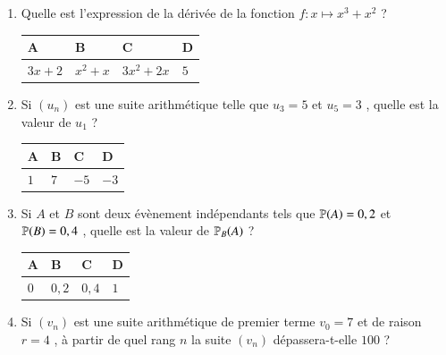 \documentclass[oneside,12pt]{exam}          %
\begin{document}
\begin{enumerate}[label=\underline{Question \no\arabic*} :  , leftmargin=* , itemsep=4mm]
	\item Quelle est l'expression de la dérivée de la fonction $f : x \mapsto x^3 + x^2$ \; ?
	
		\hspace{\linewidth-\textwidth}
		\renewcommand{\arraystretch}{1.5}
		\begin{tabular}{| P{0.22\textwidth} | P{0.22\textwidth} | P{0.22\textwidth} | P{0.22\textwidth} |} \hline
			A & B & C & D \\ \hline
			$3x + 2$ & $x^2 + x$ & $3x^2 + 2x$ & $5$ \\ \hline
		\end{tabular}



	\item Si $(u_n)$ est une suite arithmétique telle que $u_3 = 5$ et $u_5 = 3$ , quelle est la valeur de $u_1$ ?
	
		\hspace{\linewidth-\textwidth}
		\renewcommand{\arraystretch}{1.5}
		\begin{tabular}{| P{0.22\textwidth} | P{0.22\textwidth} | P{0.22\textwidth} | P{0.22\textwidth} |} \hline
			A & B & C & D \\ \hline
			$1$ & $7$ & $-5$ & $-3$ \\ \hline
		\end{tabular}
		
		

	\item Si $A$ et $B$ sont deux évènement indépendants tels que ${\mathbb P}(A) = 0,2$ et ${\mathbb P}(B) = 0,4$ , quelle est la valeur de ${\mathbb P}_B(A)$ ?
	
		\hspace{\linewidth-\textwidth}
		\renewcommand{\arraystretch}{1.5}
		\begin{tabular}{| P{0.22\textwidth} | P{0.22\textwidth} | P{0.22\textwidth} | P{0.22\textwidth} |} \hline
			A & B & C & D \\ \hline
			$0$ & $0,2$ & $0,4$ & $1$ \\ \hline
		\end{tabular}
		
		

	\item Si $(v_n)$ est une suite arithmétique de premier terme $v_0 = 7$ et de raison $r = 4$ , à partir de quel rang $n$ la suite $(v_n)$ dépassera-t-elle $100$ ?
	

\end{enumerate}
\end{document}

